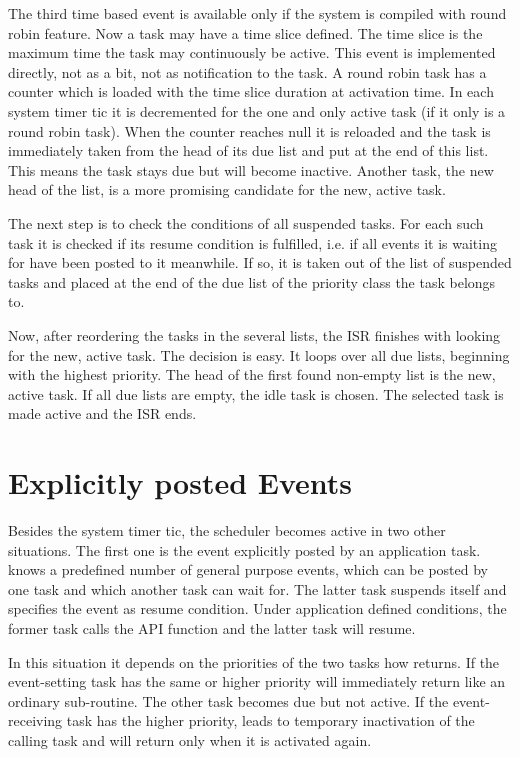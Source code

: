 The third time based event is available only if the system is compiled
with round robin feature. Now a task may have a time slice defined. The
time slice is the maximum time the task may continuously be active. This
event is implemented directly, not as a bit, not as notification to the
task. A round robin task has a counter which is loaded with the time slice
duration at activation time. In each system timer tic it is decremented
for the one and only active task (if it only is a round robin task). When
the counter reaches null it is reloaded and the task is immediately taken
from the head of its due list and put at the end of this list. This means
the task stays due but will become inactive. Another task, the new head of
the list, is a more promising candidate for the new, active task.

The next step is to check the conditions of all suspended tasks. For each
such task it is checked if its resume condition is fulfilled, i.e. if all
events it is waiting for have been posted to it meanwhile. If so, it is
taken out of the list of suspended tasks and placed at the end of the due
list of the priority class the task belongs to.

Now, after reordering the tasks in the several lists, the ISR finishes
with looking for the new, active task. The decision is easy. It loops
over all due lists, beginning with the highest priority. The head of the
first found non-empty list is the new, active task. If all due lists are
empty, the idle task is chosen. The selected task is made active and the
ISR ends.


\section{Explicitly posted Events}
\label{secManualEvents}

Besides the system timer tic, the scheduler becomes active in two other
situations. The first one is the event explicitly posted by an application
task. \rtos{} knows a predefined number of general purpose events, which
can be posted by one task and which another task can wait for. The latter
task suspends itself and specifies the event as resume condition. Under
application defined conditions, the former task calls the \rtos{} API
function  and the latter task will resume.

In this situation it depends on the priorities of the two tasks how
 returns. If the event-setting task has the same or higher
priority  will immediately return like an ordinary
sub-routine. The other task becomes due but not active. If the
event-receiving task has the higher priority,  leads to
temporary inactivation of the calling task and will return only when it is
activated again.

